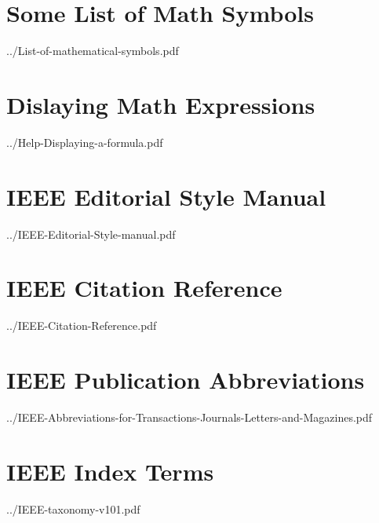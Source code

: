 \chapter{Some List of Math Symbols} 
\label{ch:math_sym}


{../List-of-mathematical-symbols.pdf}
\cleardoublepage

\chapter{Dislaying Math Expressions} 
\label{ch:disp_math}


{../Help-Displaying-a-formula.pdf}
\cleardoublepage

\chapter{IEEE Editorial Style Manual} 
\label{ch:ieee_edsm}


{../IEEE-Editorial-Style-manual.pdf}
\cleardoublepage

\chapter{IEEE Citation Reference} 
\label{ch:ieee_cr}


{../IEEE-Citation-Reference.pdf}
\cleardoublepage

\chapter{IEEE Publication Abbreviations} 
\label{ch:ieee_pub_abb}


{../IEEE-Abbreviations-for-Transactions-Journals-Letters-and-Magazines.pdf}
\cleardoublepage

\chapter{IEEE Index Terms} 
\label{ch:ieee_keywords}


{../IEEE-taxonomy-v101.pdf}
\cleardoublepage